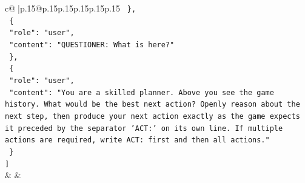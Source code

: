 \documentclass{article}
\begin{document}
{\begin{supertabular}{c@{$\;$}|p{.15\linewidth}@{}p{.15\linewidth}p{.15\linewidth}p{.15\linewidth}p{.15\linewidth}p{.15\linewidth}}
{{{\texttt{  \},} \\
\texttt{  \{} \\
\texttt{    "role": "user",} \\
\texttt{    "content": "QUESTIONER: What is here?"} \\
\texttt{  \},} \\
\texttt{  \{} \\
\texttt{    "role": "user",} \\
\texttt{    "content": "You are a skilled planner. Above you see the game history. What would be the best next action? Openly reason about the next step, then produce your next action exactly as the game expects it preceded by the separator 'ACT:' on its own line. If multiple actions are required, write ACT: first and then all actions."} \\
\texttt{  \}} \\
\texttt{{]}} \\
            }
        }
    }
    & & \\ \\


\end{supertabular}}
\end{document}
